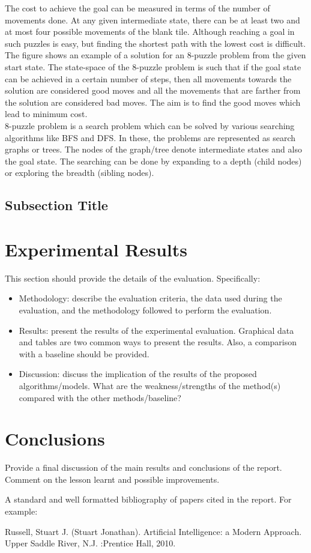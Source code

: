 \documentclass{svproc}
\begin{document}
The cost to achieve the goal can be measured in terms of the number of movements done. At any given intermediate state, there can be at least two and at most four possible movements of the blank tile. Although reaching a goal in such puzzles is easy, but finding the shortest path with the lowest cost is difficult. The figure shows an example of a solution for an 8-puzzle problem from the given start state. The state-space of the 8-puzzle problem is such that if the goal state can be achieved in a certain number of steps, then all movements towards the solution are considered good moves and all the movements that are farther from the solution are considered bad moves. The aim is to find the good moves which lead to minimum cost. \\

8-puzzle problem is a search problem which can be solved by various searching algorithms like BFS and DFS. In these, the problems are represented as search graphs or trees. The nodes of the graph/tree denote intermediate states and also the goal state. The searching can be done by expanding to a depth (child nodes) or exploring the breadth (sibling nodes). \\

\subsection{Subsection Title}

\section{Experimental Results}
This section should provide the details of the evaluation. Specifically:
\begin{itemize}
\item Methodology: describe the evaluation criteria, the data used during the evaluation, and the methodology followed to perform the evaluation. 
\item Results: present the results of the experimental evaluation. Graphical data and tables are two common ways to present the results. Also, a comparison with a baseline should be provided.
\item Discussion: discuss the implication of the results of the proposed algorithms/models. What are the weakness/strengths of the method(s) compared with the other methods/baseline?
\end{itemize}

\section{Conclusions}
Provide a final discussion of the main results and conclusions of the report. Comment on the lesson learnt and possible improvements.


A standard and well formatted bibliography of papers cited in the report. For example:

\begin{thebibliography}{6}
%

Russell, Stuart J. (Stuart Jonathan). Artificial Intelligence: a Modern Approach. Upper Saddle River, N.J.       :Prentice Hall, 2010.


\end{thebibliography}
\end{document}
